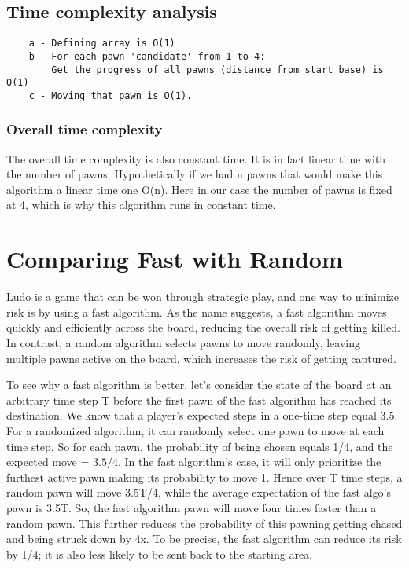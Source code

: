 \documentclass{article} %
\begin{document}
\subsection{Time complexity analysis}

\begin{verbatim}
    a - Defining array is O(1)
    b - For each pawn 'candidate' from 1 to 4:
        Get the progress of all pawns (distance from start base) is O(1)
    c - Moving that pawn is O(1).
\end{verbatim}

\subsubsection{Overall time complexity}

The overall time complexity is also constant time. It is in fact linear time with the number of pawns. Hypothetically if we had n pawns that would make this algorithm a linear time one O(n). Here in our case the number of pawns is fixed at 4, which is why this algorithm runs in constant time.


\section{Comparing Fast with Random}
Ludo is a game that can be won through strategic play, and one way to minimize risk is by using a fast algorithm. As the name suggests, a fast algorithm moves quickly and efficiently across the board, reducing the overall risk of getting killed. In contrast, a random algorithm selects pawns to move randomly, leaving multiple pawns active on the board, which increases the risk of getting captured.

To see why a fast algorithm is better, let's consider the state of the board at an arbitrary time step T before the first pawn of the fast algorithm has reached its destination. We know that a player's expected steps in a one-time step equal $3.5$. For a randomized algorithm, it can randomly select one pawn to move at each time step. So for each pawn, the probability of being chosen equals 1/4, and the expected move = $3.5/4$. In the fast algorithm's case, it will only prioritize the furthest active pawn making its probability to move 1. Hence over T time steps, a random pawn will move 3.5T/4, while the average expectation of the fast algo's pawn is 3.5T. So, the fast algorithm pawn will move four times faster than a random pawn. This further reduces the probability of this pawning getting chased and being struck down by 4x. To be precise, the fast algorithm can reduce its risk by 1/4; it is also less likely to be sent back to the starting area.
\end{document}

